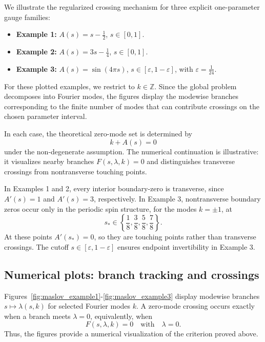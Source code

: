 \documentclass[11pt]{article}
\theoremstyle{definition}
\numberwithin{equation}{section}
\begin{document}
We illustrate the regularized crossing mechanism for three explicit one-parameter gauge families:
\begin{itemize}
\item \textbf{Example 1:} \(A(s)=s-\tfrac12\), \quad \(s\in[0,1]\).
\item \textbf{Example 2:} \(A(s)=3s-\tfrac14\), \quad \(s\in[0,1]\).
\item \textbf{Example 3:} \(A(s)=\sin(4\pi s)\), \quad \(s\in[\varepsilon,1-\varepsilon]\), with \(\varepsilon=\tfrac1{24}\).
\end{itemize}
For these plotted examples, we restrict to \(k\in\mathbb Z\). Since the global problem decomposes into Fourier modes, the figures display the modewise branches corresponding to the finite number of modes that can contribute crossings on the chosen parameter interval.

In each case, the theoretical zero-mode set is determined by
\begin{equation}
k+A(s)=0
\end{equation}
under the non-degenerate assumption. The numerical continuation is illustrative: it visualizes nearby branches \(F(s,\lambda,k)=0\) and distinguishes transverse crossings from nontransverse touching points.

In Examples 1 and 2, every interior boundary-zero is transverse, since \(A'(s)=1\) and \(A'(s)=3\), respectively. In Example 3, nontransverse boundary zeros occur only in the periodic spin structure, for the modes \(k=\pm1\), at
\begin{equation}
s_* \in \left\{ \frac18,\frac38,\frac58,\frac78 \right\}.
\end{equation}
At these points \(A'(s_*)=0\), so they are touching points rather than transverse crossings. The cutoff \(s\in[\varepsilon,1-\varepsilon]\) ensures endpoint invertibility in Example 3.

\subsection{Numerical plots: branch tracking and crossings}\label{subsec:plots_maslov}

Figures~\ref{fig:maslov_example1}-\ref{fig:maslov_example3} display modewise branches \(s\mapsto \lambda(s,k)\) for selected Fourier modes \(k\). A zero-mode crossing occurs exactly when a branch meets \(\lambda=0\), equivalently, when
\begin{equation}
F(s,\lambda,k)=0
\quad\text{with}\quad
\lambda=0.
\end{equation}
Thus, the figures provide a numerical visualization of the criterion proved above.
\end{document}
